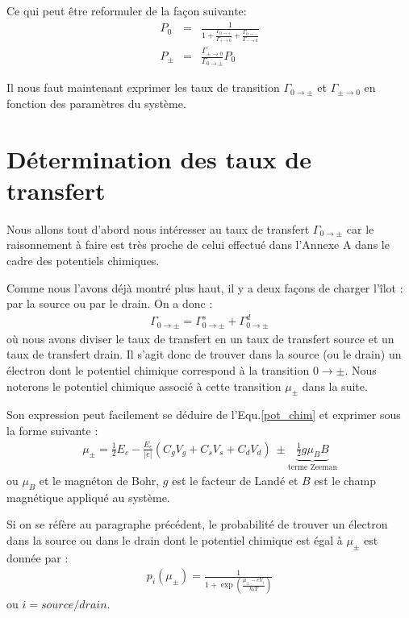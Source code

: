 Ce qui peut être reformuler de la façon suivante:
\begin{eqnarray}
P_0 &=& \frac{1}{1 + \frac{\Gamma_{0 \rightarrow +}}{\Gamma_{+ \rightarrow 0}} + \frac{\Gamma_{0 \rightarrow -}}{\Gamma_{- \rightarrow 0}}} \\
P_{\pm} &=& \frac{\Gamma_{\pm \rightarrow 0}}{\Gamma_{0 \rightarrow \pm}}P_0 
\end{eqnarray}


Il nous faut maintenant exprimer les taux de transition $\Gamma_{0 \rightarrow \pm}$ et $\Gamma_{\pm \rightarrow 0}$ en fonction des paramètres du système. 

\section{Détermination des taux de transfert}
Nous allons tout d'abord nous intéresser au taux de transfert $\Gamma_{0 \rightarrow \pm}$ car le raisonnement à faire est très proche de celui effectué dans l'Annexe A dans le cadre des potentiels chimiques. 

Comme nous l'avons déjà montré plus haut, il y a deux façons de charger l'\^ilot : par la source ou par le drain. On a donc :
\begin{eqnarray}
\Gamma_{0 \rightarrow \pm} = \Gamma_{0 \rightarrow \pm}^s + \Gamma_{0 \rightarrow \pm}^d
\end{eqnarray}
où nous avons diviser le taux de transfert en un taux de transfert source et un taux de transfert drain. Il s'agit donc de trouver dans la source (ou le drain) un électron dont le potentiel chimique correspond à la transition $0\rightarrow \pm$. Nous noterons le potentiel chimique associé à cette transition $\mu_{\pm}$ dans la suite. 

Son expression peut facilement se déduire de l'Equ.\ref{pot_chim} et exprimer sous la forme suivante :
\begin{eqnarray}
\mu_{\pm} = \frac{1}{2}E_c - \frac{E_c}{|e|}(C_gV_g + C_sV_s + C_dV_d)~ \pm \underbrace{ \frac{1}{2}g \mu_B B}_{\text{terme Zeeman}}
\end{eqnarray}
ou  $\mu_B$ et le magnéton de Bohr, $g$ est le facteur de Landé et $B$ est le champ magnétique appliqué au système.

Si on se réfère au paragraphe précédent, le probabilité de trouver un électron dans la source ou dans le drain dont le potentiel chimique est égal à $\mu_{\pm}$ est donnée par :
\begin{eqnarray}
p_i(\mu_\pm) = \frac{1}{1 + \exp{(\frac{\mu_\pm - eV_i}{k_bT})}}
\end{eqnarray}
ou $i=source/drain$. 

